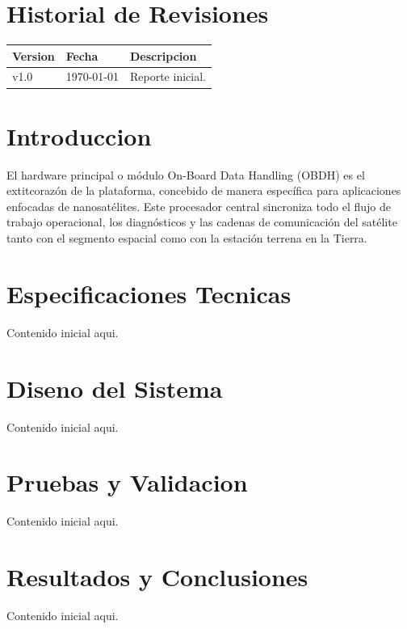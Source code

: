 \documentclass[a4paper, twoside, 12pt]{report}
\begin{document}

\begin{abstract}
    Escribe aqui el resumen ejecutivo del reporte.
\end{abstract}

\chapter*{Historial de Revisiones}
\begin{center}
\begin{tabular}{p{2cm} p{3cm} p{9cm}}
\toprule
\textbf{Version} & \textbf{Fecha} & \textbf{Descripcion} \\
\midrule
v1.0 & \today & Reporte inicial. \\
\bottomrule
\end{tabular}
\end{center}

\clearpage
\tableofcontents
\listoffigures
\listoftables
\clearpage


\chapter{Introduccion}
El hardware principal o módulo On-Board Data Handling (OBDH) es el 	extit{corazón} de la plataforma, concebido de manera específica para aplicaciones enfocadas de nanosatélites. Este procesador central sincroniza todo el flujo de trabajo operacional, los diagnósticos y las cadenas de comunicación del satélite tanto con el segmento espacial como con la estación terrena en la Tierra.

\chapter{Especificaciones Tecnicas}
Contenido inicial aqui.

\chapter{Diseno del Sistema}
Contenido inicial aqui.

\chapter{Pruebas y Validacion}
Contenido inicial aqui.

\chapter{Resultados y Conclusiones}
Contenido inicial aqui.

% 
% 
\end{document}
